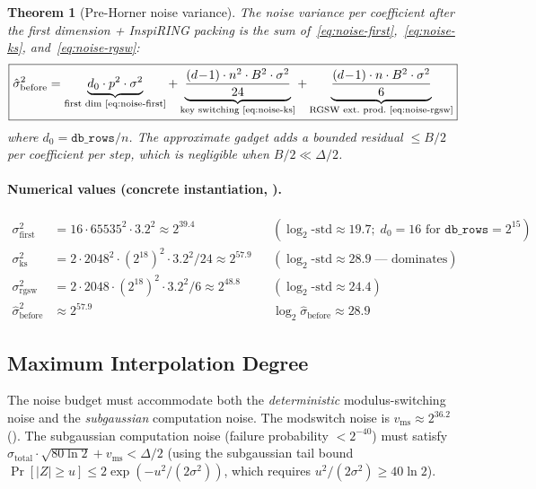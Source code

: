 \documentclass[11pt,a4paper]{article}
\newtheorem{theorem}{Theorem}
\begin{document}
\begin{theorem}[Pre-Horner noise variance]\label{thm:noise}
The noise variance per coefficient after the first dimension + InspiRING packing is the sum of~\eqref{eq:noise-first},~\eqref{eq:noise-ks}, and~\eqref{eq:noise-rgsw}:
\begin{equation}
    \boxed{\hat{\sigma}_{\mathrm{before}}^2
    = \underbrace{d_0 \cdot p^2 \cdot \sigma^2}_{\text{first dim~\eqref{eq:noise-first}}}
    + \underbrace{\frac{(d\!-\!1) \cdot n^2 \cdot B^2 \cdot \sigma^2}{24}}_{\text{key switching~\eqref{eq:noise-ks}}}
    + \underbrace{\frac{(d\!-\!1) \cdot n \cdot B^2 \cdot \sigma^2}{6}}_{\text{RGSW ext.\ prod.~\eqref{eq:noise-rgsw}}}}
    \label{eq:sigma-before}
\end{equation}
where $d_0 = \texttt{db\_rows}/n$.
The approximate gadget adds a bounded residual $\le B/2$ per coefficient per step, which is negligible when $B/2 \ll \Delta/2$.
\end{theorem}

\paragraph{Numerical values (concrete instantiation, ).}
\begin{align*}
    \sigma_{\mathrm{first}}^2 &= 16 \cdot 65535^2 \cdot 3.2^2 \approx 2^{39.4} && (\log_2\text{-std} \approx 19.7; \; d_0 = 16 \text{ for } \texttt{db\_rows} = 2^{15}) \\
    \sigma_{\mathrm{ks}}^2 &= 2 \cdot 2048^2 \cdot (2^{18})^2 \cdot 3.2^2 / 24 \approx 2^{57.9} && (\log_2\text{-std} \approx 28.9 \;\text{--- dominates}) \\
    \sigma_{\mathrm{rgsw}}^2 &= 2 \cdot 2048 \cdot (2^{18})^2 \cdot 3.2^2 / 6 \approx 2^{48.8} && (\log_2\text{-std} \approx 24.4) \\[6pt]
    \hat{\sigma}_{\mathrm{before}}^2 &\approx 2^{57.9} && \log_2 \hat{\sigma}_{\mathrm{before}} \approx 28.9
\end{align*}

\subsection{Maximum Interpolation Degree}\label{sec:dmax}

The noise budget must accommodate both the \emph{deterministic} modulus-switching noise and the \emph{subgaussian} computation noise.
The modswitch noise is $v_{\mathrm{ms}} \approx 2^{36.2}$ ().
The subgaussian computation noise (failure probability $< 2^{-40}$) must satisfy $\hat{\sigma}_{\mathrm{total}} \cdot \sqrt{80 \ln 2} + v_{\mathrm{ms}} < \Delta/2$ (using the subgaussian tail bound $\Pr[|Z| \ge u] \le 2\exp(-u^2/(2\sigma^2))$, which requires $u^2/(2\sigma^2) \ge 40\ln 2$).
\end{document}
